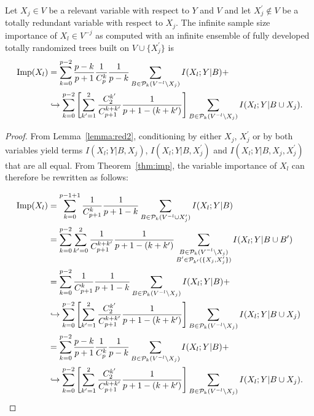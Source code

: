 \begin{proposition}\label{prop:red:other}
Let $X_j\in V$ be a relevant variable with respect to $Y$ and $V$ and let
$X_j^\prime \notin V$ be a totally redundant variable with respect to $X_j$.
The infinite sample size importance of $X_l \in V^{-j}$ as computed with an infinite
ensemble of fully developed totally randomized trees built on $V\cup
\{X_j^\prime\}$ is
\begin{align}\label{prop:red:other:eqn}
\text{Imp}(X_l) &= \sum_{k=0}^{p-2} \frac{p-k}{p+1} \frac{1}{C_p^k} \frac{1}{p-k} \sum_{B \in {\cal P}_k(V^{-l} \setminus X_j)} I(X_l;Y|B) + \\
                & \hookrightarrow \sum_{k=0}^{p-2}  \left[ \sum_{k'=1}^2 \frac{C^{k'}_2}{C_{p+1}^{k+k'}} \frac{1}{p+1-(k+k')} \right]  \sum_{B \in {\cal P}_k(V^{-l}\setminus X_j)} I(X_l;Y|B\cup X_j). \nonumber
\end{align}
\end{proposition}

\begin{proof}
From Lemma~\ref{lemma:red2}, conditioning by either $X_j$, $X_j^\prime$ or by
both  variables yield terms $I(X_l;Y|B,X_j)$, $I(X_l;Y|B,X_j^\prime)$ and
$I(X_l;Y|B,X_j,X_j^\prime)$ that are all equal. From Theorem~\ref{thm:imp}, the
variable importance of $X_l$ can therefore be rewritten as follows:

\begin{align}
\text{Imp}(X_l) &= \sum_{k=0}^{p-1+1} \frac{1}{C_{p+1}^k} \frac{1}{p+1-k} \sum_{B \in {\cal P}_k(V^{-l}\cup X_j^\prime)} I(X_l;Y|B) \nonumber \\
           &= \sum_{k=0}^{p-2} \sum_{k'=0}^2 \frac{1}{C_{p+1}^{k+k'}} \frac{1}{p+1-(k+k')} \sum_{\substack{B \in {\cal P}_k(V^{-l} \setminus X_j)\\ B' \in {\cal P}_{k'}(\{X_j, X_j^\prime\})} } I(X_l;Y|B \cup B') \nonumber \\
           &= \sum_{k=0}^{p-2} \frac{1}{C_{p+1}^k} \frac{1}{p+1-k} \sum_{B \in {\cal P}_k(V^{-l} \setminus X_j)} I(X_l;Y|B) + \nonumber \\
           & \hookrightarrow \sum_{k=0}^{p-2} \left[ \sum_{k'=1}^2 \frac{C^{k'}_2}{C_{p+1}^{k+k'}} \frac{1}{p+1-(k+k')} \right] \sum_{B \in {\cal P}_k(V^{-l} \setminus X_j)} I(X_l;Y|B \cup X_j) \nonumber \\
           &= \sum_{k=0}^{p-2} \frac{p-k}{p+1} \frac{1}{C_p^k} \frac{1}{p-k} \sum_{B \in {\cal P}_k(V^{-l} \setminus X_j)} I(X_l;Y|B) + \nonumber \\
           & \hookrightarrow \sum_{k=0}^{p-2}  \left[ \sum_{k'=1}^2 \frac{C^{k'}_2}{C_{p+1}^{k+k'}} \frac{1}{p+1-(k+k')} \right]  \sum_{B \in {\cal P}_k(V^{-l}\setminus X_j)} I(X_l;Y|B\cup X_j). \nonumber
\end{align}
\end{proof}

